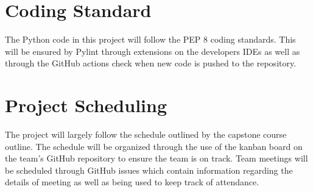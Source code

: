 \documentclass{article}
\begin{document}
\section{Coding Standard}

The Python code in this project will follow the PEP 8 coding standards.
This will be ensured by Pylint through extensions on the developers IDEs
as well as through the GitHub actions check when new code is pushed to the repository.

\section{Project Scheduling}

The project will largely follow the schedule outlined by the capstone course outline.
The schedule will be organized through the use of the kanban board on the team's GitHub
repository to ensure the team is on track. Team meetings will be scheduled through GitHub issues
which contain information regarding the details of meeting as well as being used to
keep track of attendance.
\end{document}
